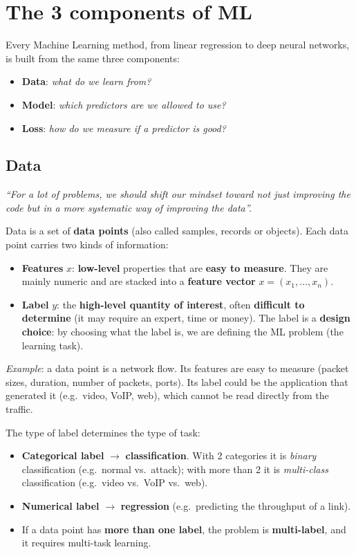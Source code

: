 \chapter{The 3 components of ML}

Every Machine Learning method, from linear regression to deep neural networks, is built from the same three components:
\begin{itemize}
    \item \textbf{Data}: \emph{what do we learn from?}
    \item \textbf{Model}: \emph{which predictors are we allowed to use?}
    \item \textbf{Loss}: \emph{how do we measure if a predictor is good?}
\end{itemize}

\section{Data}

\textit{``For a lot of problems, we should shift our mindset toward not just improving the code but in a more systematic way of improving the data''.}

Data is a set of \textbf{data points} (also called samples, records or objects). Each data point carries two kinds of information:

\begin{itemize}
    \item \textbf{Features} $x$: \textbf{low-level} properties that are \textbf{easy to measure}. They are mainly numeric and are stacked into a \textbf{feature vector} $x = (x_1, \dots, x_n)$.
    \item \textbf{Label} $y$: the \textbf{high-level quantity of interest}, often \textbf{difficult to determine} (it may require an expert, time or money). The label is a \textbf{design choice}: by choosing what the label is, we are defining the ML problem (the learning task).
\end{itemize}

\emph{Example}: a data point is a network flow. Its features are easy to measure (packet sizes, duration, number of packets, ports). Its label could be the application that generated it (e.g.\ video, VoIP, web), which cannot be read directly from the traffic.

The type of label determines the type of task:
\begin{itemize}
    \item \textbf{Categorical label} $\rightarrow$ \textbf{classification}. With 2 categories it is \emph{binary} classification (e.g.\ normal vs.\ attack); with more than 2 it is \emph{multi-class} classification (e.g.\ video vs.\ VoIP vs.\ web).
    \item \textbf{Numerical label} $\rightarrow$ \textbf{regression} (e.g.\ predicting the throughput of a link).
    \item If a data point has \textbf{more than one label}, the problem is \textbf{multi-label}, and it requires multi-task learning.
\end{itemize}

